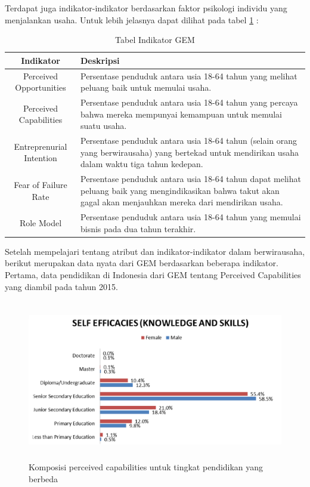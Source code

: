 \documentclass[a4paper,twoside]{article}
\begin{document}
\begin{enumerate}
Terdapat juga indikator-indikator berdasarkan faktor psikologi individu yang menjalankan usaha. Untuk lebih jelasnya dapat dilihat pada tabel \ref{tabelindikator} :

\begin{table}[H]
\centering
\caption{Tabel Indikator GEM}
\begin{tabular}{|c|p{8cm}|}
\hline
Indikator & Deskripsi\\
\hline
Perceived Opportunities & Persentase penduduk antara usia 18-64 tahun yang melihat peluang baik untuk memulai usaha. \\
\hline
Perceived Capabilities & Persentase penduduk antara usia 18-64 tahun yang percaya bahwa mereka mempunyai kemampuan untuk memulai suatu usaha. \\
\hline
Entreprenurial Intention & Persentase penduduk antara usia 18-64 tahun (selain orang yang berwirausaha) yang bertekad untuk mendirikan usaha dalam waktu tiga tahun kedepan.\\
\hline
Fear of Failure Rate & Persentase penduduk antara usia 18-64 tahun dapat melihat peluang baik yang mengindikasikan bahwa takut akan gagal akan menjauhkan mereka dari mendirikan usaha. \\
\hline
Role Model & Persentase penduduk antara usia 18-64 tahun yang memulai bisnis pada dua tahun terakhir.\\
\hline
\end{tabular}
\label{tabelindikator}
\end{table}


Setelah mempelajari tentang atribut dan indikator-indikator dalam berwirausaha, berikut merupakan data nyata dari GEM berdasarkan beberapa indikator. Pertama, data pendidikan di Indonesia dari GEM tentang Perceived Capabilities yang diambil pada tahun 2015.

\begin{figure} [H]
	\centering  
	\includegraphics[width=14cm, height=7cm]{PCPendidikan} 
	\caption[Komposisi perceived capabilities untuk tingkat pendidikan yang berbeda]{Komposisi perceived capabilities untuk tingkat pendidikan yang berbeda} 
	\label{fig:PCPendidikan} 
\end{figure}


\end{enumerate}
\end{document}
